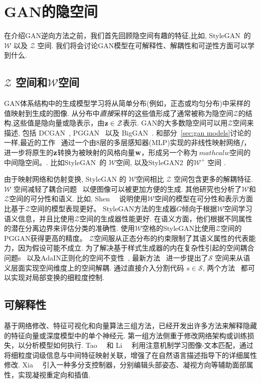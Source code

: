 \section{GAN的隐空间}
\label{sec:feature}
在介绍GAN逆向方法之前，我们首先回顾隐空间有趣的特征,比如, StyleGAN~\cite{karras2019style}的$\mathcal{W}$ 以及 $\mathcal{Z}$ 空间.
我们将会讨论GAN模型在可解释性、解耦性和可逆性方面可以学到什么.


\subsection{$\mathcal{Z}$ 空间和$\mathcal{W}$空间}
\label{sec:space}

GAN体系结构中的生成模型学习将从简单分布(例如，正态或均匀分布)中采样的值映射到生成的图像.
从分布中\emph{直接}采样的这些值形成了通常被称为隐空间$\mathcal{Z}$的结构,这些值是隐向量或隐表示，由$\mathbf{z} \in \mathcal{Z}$表示.
GAN的大多数隐空间可以用$\mathcal{Z}$空间来描述, 包括 DCGAN~\cite{radford2016dcgan}, PGGAN~\cite{karras2017progressive} 以及 BigGAN~\cite{brock2018large}.
和部分~\ref{sec:gan models}讨论的一样,最近的工作~\cite{karras2019style} 通过一个由$8$层的多层感知器(MLP)实现的非线性映射网络$f$，进一步将原生的$\mathbf{z}$转换为被映射的风格向量$\mathbf{w}$，形成另一个称为$\ mathcal{w}$空间的中间隐空间。. 
比如StyleGAN~\cite{karras2019style}的 $\mathcal{W}$空间, 以及StyleGAN2~\cite{karras2020analyzing}的$\mathcal{W}^{+}$ 空间 .


由于映射网络和仿射变换, StyleGAN 的 $\mathcal{W}$空间相比 $\mathcal{Z}$ 空间包含更多的解耦特征. 
$\mathcal{W}$ 空间减轻了耦合问题~\cite{karras2019style} 以便图像可以被更加方便的生成. 
其他研究也分析了$\mathcal{W}$和$\mathcal{Z}$空间的可分性和语义.
比如, Shen~\etal~\cite{shen2020interpreting} 说明使用$\mathcal{W}$空间的模型在可分性和表示方面比基于$\mathcal{Z}$空间的模型表现更好。
StyleGAN方法的生成器$G$倾向于根据$\mathcal{W}$空间学习语义信息，并且比使用$\mathcal{Z}$空间的生成器性能更好.
在语义方面，他们根据不同属性的潜在分离边界来评估分类的准确性.
使用$\mathcal{W}$空格的StyleGAN比使用$\mathcal{Z}$空间的PGGAN获得更高的精度。
$\mathcal{Z}$空间服从正态分布的约束限制了其语义属性的代表能力，因为假设可能不成立. 
为了解决基于样式生成器的内在复杂性引起的空间耦合问题s~\cite{karras2019style} 以及AdaIN正则化的空间不变性~\cite{huang2017adain}, 最新方法~\cite{liu2020style,wu2020stylespace} 进一步提出了$\mathcal{S}$ 空间来从语义层面实现空间维度上的空间解耦.
通过直接介入分割代码 $s \in \mathcal{S}$, 两个方法~\cite{liu2020style,wu2020stylespace} 都可以实现对局部变换的细粒度控制.

\subsection{可解释性}
基于网络修改、特征可视化和向量算法三组方法，已经开发出许多方法来解释隐藏的特征向量或深度模型中的单个神经元.
第一组方法侧重于修改网络架构或训练损失，以分析模型如何执行. 
Tao~\etal~\cite{Tao18attngan} 和 Li~\etal~\cite{li2019control,li2020manigan} 利用注意机制学习图像-文本匹配，通过将细粒度词级信息与中间特征映射关联，增强了在自然语言描述指导下的详细属性修改.
Xia~\etal~\cite{xia2020gaze} 引入一种多分支控制器，分别编辑头部姿态、凝视方向等辅助面部属性，实现凝视重定向和插值.

